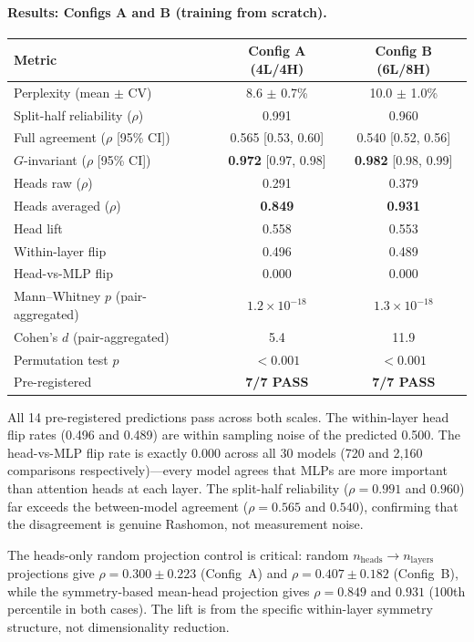 \documentclass[11pt,a4paper]{article}
\begin{document}
\paragraph{Results: Configs A and B (training from scratch).}

\begin{center}
\small
\begin{tabular}{@{}lcc@{}}
\toprule
Metric & Config A (4L/4H) & Config B (6L/8H) \\
\midrule
Perplexity (mean $\pm$ CV) & 8.6 $\pm$ 0.7\% & 10.0 $\pm$ 1.0\% \\
Split-half reliability ($\rho$) & 0.991 & 0.960 \\
Full agreement ($\rho$ [95\% CI]) & 0.565 [0.53, 0.60] & 0.540 [0.52, 0.56] \\
$G$-invariant ($\rho$ [95\% CI]) & \textbf{0.972} [0.97, 0.98] & \textbf{0.982} [0.98, 0.99] \\
Heads raw ($\rho$) & 0.291 & 0.379 \\
Heads averaged ($\rho$) & \textbf{0.849} & \textbf{0.931} \\
Head lift & 0.558 & 0.553 \\
Within-layer flip & 0.496 & 0.489 \\
Head-vs-MLP flip & 0.000 & 0.000 \\
Mann--Whitney $p$ (pair-aggregated) & $1.2 \times 10^{-18}$ & $1.3 \times 10^{-18}$ \\
Cohen's $d$ (pair-aggregated) & 5.4 & 11.9 \\
Permutation test $p$ & $< 0.001$ & $< 0.001$ \\
Pre-registered & \textbf{7/7 PASS} & \textbf{7/7 PASS} \\
\bottomrule
\end{tabular}
\end{center}

All 14 pre-registered predictions pass across both scales.  The within-layer head flip rates (0.496 and 0.489) are within sampling noise of the predicted 0.500.  The head-vs-MLP flip rate is exactly 0.000 across all 30 models (720 and 2{,}160 comparisons respectively)---every model agrees that MLPs are more important than attention heads at each layer.  The split-half reliability ($\rho = 0.991$ and $0.960$) far exceeds the between-model agreement ($\rho = 0.565$ and $0.540$), confirming that the disagreement is genuine Rashomon, not measurement noise.

The heads-only random projection control is critical: random $n_\mathrm{heads} \to n_\mathrm{layers}$ projections give $\rho = 0.300 \pm 0.223$ (Config~A) and $\rho = 0.407 \pm 0.182$ (Config~B), while the symmetry-based mean-head projection gives $\rho = 0.849$ and $0.931$ (100th percentile in both cases).  The lift is from the specific within-layer symmetry structure, not dimensionality reduction.
\end{document}
